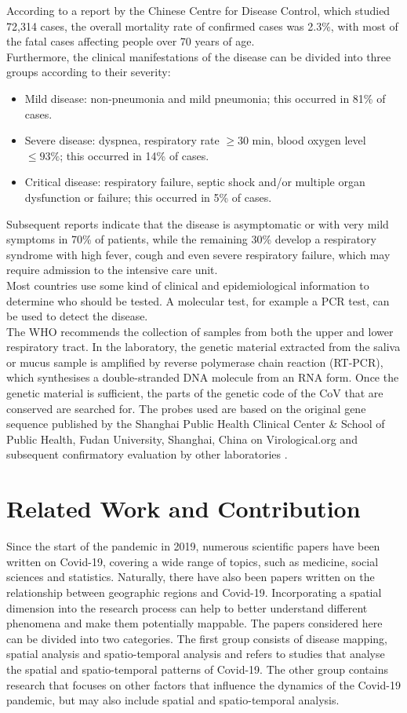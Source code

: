 According to a report by the Chinese Centre for Disease Control, which studied 72,314 cases, the overall mortality rate of confirmed cases was 2.3\%, with most of the fatal cases affecting people over 70 years of age. \\
Furthermore, the clinical manifestations of the disease can be divided into three groups according to their severity:
\begin{itemize}
    \item Mild disease: non-pneumonia and mild pneumonia; this occurred in 81\% of cases.
    \item Severe disease: dyspnea, respiratory rate $\geq 30$ min, blood oxygen level $\leq 93\%$; this occurred in 14\% of cases.
    \item Critical disease: respiratory failure, septic shock and/or multiple organ dysfunction or failure; this occurred in 5\% of cases.
\end{itemize}
Subsequent reports indicate that the disease is asymptomatic or with very mild symptoms in 70\% of patients, while the remaining 30\% develop a respiratory syndrome with high fever, cough and even severe respiratory failure, which may require admission to the intensive care unit. \\
Most countries use some kind of clinical and epidemiological information to determine who should be tested. A molecular test, for example a PCR test, can be used to detect the disease.\\
The WHO recommends the collection of samples from both the upper and lower respiratory tract. In the laboratory, the genetic material extracted from the saliva or mucus sample is amplified by reverse polymerase chain reaction (RT-PCR), which synthesises a double-stranded DNA molecule from an RNA form. Once the genetic material is sufficient, the parts of the genetic code of the CoV that are conserved are searched for. The probes used are based on the original gene sequence published by the Shanghai Public Health Clinical Center \& School of Public Health, Fudan University, Shanghai, China on Virological.org and subsequent confirmatory evaluation by other laboratories \autocite[][]{cascella2021features}.
\clearpage
\section{Related Work and Contribution}
Since the start of the pandemic in 2019, numerous scientific papers have been written on Covid-19, covering a wide range of topics, such as medicine, social sciences and statistics. Naturally, there have also been papers written on the relationship between geographic regions and Covid-19. Incorporating a spatial dimension into the research process can help to better understand different phenomena and make them potentially mappable. The papers considered here can be divided into two categories. The first group consists of disease mapping, spatial analysis and spatio-temporal analysis and refers to studies that analyse the spatial and spatio-temporal patterns of Covid-19. The other group contains research that focuses on other factors that influence the dynamics of the Covid-19 pandemic, but may also include spatial and spatio-temporal analysis.
